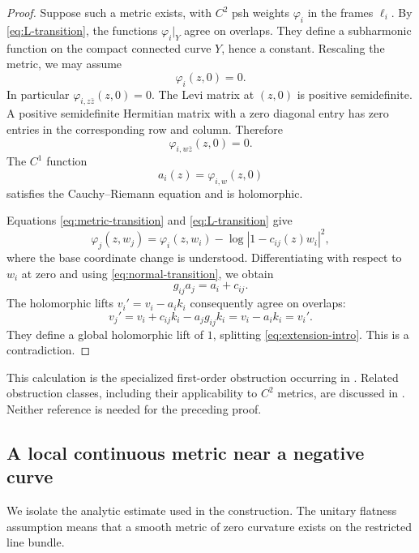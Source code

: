 \documentclass[11pt]{amsart}
\theoremstyle{definition}
\theoremstyle{remark}
\numberwithin{equation}{section}
\begin{document}
\begin{proof}
Suppose such a metric exists, with $C^2$ psh weights $\varphi_i$ in the
frames $\ell_i$. By \eqref{eq:L-transition}, the functions
$\varphi_i|_Y$ agree on overlaps. They define a subharmonic function on
the compact connected curve $Y$, hence a constant. Rescaling the metric,
we may assume
\begin{equation}\label{eq:flat-value}
 \varphi_i(z,0)=0.
\end{equation}
In particular $\varphi_{i,z\bar z}(z,0)=0$. The Levi matrix at $(z,0)$
is positive semidefinite. A positive semidefinite Hermitian matrix with
a zero diagonal entry has zero entries in the corresponding row and
column. Therefore
\[
 \varphi_{i,w\bar z}(z,0)=0.
\]
The $C^1$ function
\[
 a_i(z)=\varphi_{i,w}(z,0)
\]
satisfies the Cauchy--Riemann equation and is holomorphic.

Equations \eqref{eq:metric-transition} and \eqref{eq:L-transition} give
\[
 \varphi_j(z,w_j)
 =\varphi_i(z,w_i)-\log|1-c_{ij}(z)w_i|^2,
\]
where the base coordinate change is understood. Differentiating with
respect to $w_i$ at zero and using \eqref{eq:normal-transition}, we obtain
\begin{equation}\label{eq:coboundary}
 g_{ij}a_j=a_i+c_{ij}.
\end{equation}
The holomorphic lifts $v_i'=v_i-a_ik_i$ consequently agree on overlaps:
\[
 v_j'=v_i+c_{ij}k_i-a_jg_{ij}k_i=v_i-a_ik_i=v_i'.
\]
They define a global holomorphic lift of $1$, splitting
\eqref{eq:extension-intro}. This is a contradiction.
\end{proof}

This calculation is the specialized first-order obstruction occurring
in \cite[Theorem~1.4 and Example~4.1]{Koike2021}. Related obstruction
classes, including their applicability to $C^2$ metrics, are discussed
in \cite{Wu2026}. Neither reference is needed for the preceding proof.

\subsection{A local continuous metric near a negative curve}\label{sec:cusp}

We isolate the analytic estimate used in the construction. The unitary
flatness assumption means that a smooth metric of zero curvature exists
on the restricted line bundle.
\end{document}
